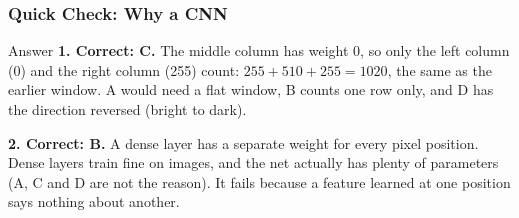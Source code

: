 \begin{frame}[fragile] \frametitle{Quick Check: Why a CNN}
\begin{block}{Answer}
\textbf{1. Correct: C.} The middle column has weight 0, so only the left column (0) and the right column (255) count: $255 + 510 + 255 = 1020$, the same as the earlier window. A would need a flat window, B counts one row only, and D has the direction reversed (bright to dark).

\textbf{2. Correct: B.} A dense layer has a separate weight for every pixel position. Dense layers train fine on images, and the net actually has plenty of parameters (A, C and D are not the reason). It fails because a feature learned at one position says nothing about another.
\end{block}
\end{frame}






